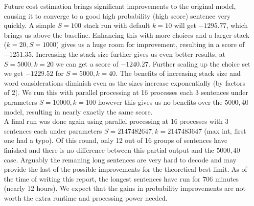 \documentclass{article}
\begin{document}
Future cost estimation brings significant improvements to the original model, causing it to converge to a good high probability (high score) sentence very quickly. A simple $S=100$ stack run with default $k=10$ will get $-1295.77$, which brings us above the baseline. Enhancing this with more choices and a larger stack ($k=20, S=1000$) gives us a huge room for improvement, resulting in a score of $-1251.35$. Increasing the stack size further gives us even better results, at $S=5000, k=20$ we can get a score of $-1240.27$. Further scaling up the choice set we get $-1229.52$ for $S=5000, k=40$. The benefits of increasing stack size and word considerations diminish even as the sizes increase exponentially (by factors of 2). We run this with parallel processing at 16 processes each 3 sentences under parameters $S=10000, k=100$ however this gives us no benefits over the $5000, 40$ model, resulting in nearly exactly the same score.\\

A final run was done again using parallel processing at 16 processes with 3 sentences each under parameters $S=2147482647, k=2147483647$ (max int, first one had a typo). Of this round, only 12 out of 16 groups of sentences have finished and there is no difference between this partial output and the $5000, 40$ case. Arguably the remaning long sentences are very hard to decode and may provide the last of the possible improvements for the theoretical best limit. As of the time of writing this report, the longest sentences have run for $706$ minutes (nearly 12 hours). We expect that the gains in probability improvements are not worth the extra runtime and processing power needed.

\end{document}
